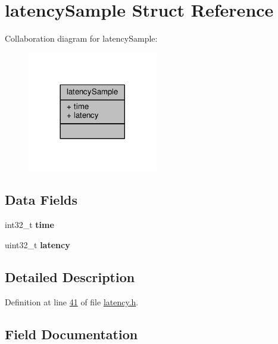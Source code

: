 \hypertarget{structlatencySample}{}\section{latency\+Sample Struct Reference}
\label{structlatencySample}


Collaboration diagram for latency\+Sample\+:\nopagebreak
\begin{figure}[H]
\begin{center}
\leavevmode
\includegraphics[width=161pt]{structlatencySample__coll__graph}
\end{center}
\end{figure}
\subsection*{Data Fields}
\begin{DoxyCompactItemize}
\item 
\mbox{\label{structlatencySample_a163b691b85c7eeafc5f495dbaf9cb52f}} 
int32\+\_\+t {\bfseries time}
\item 
\mbox{\label{structlatencySample_afedef06f839e6d4c179bdb611a72ef64}} 
uint32\+\_\+t {\bfseries latency}
\end{DoxyCompactItemize}


\subsection{Detailed Description}


Definition at line \hyperlink{latency_8h_source_l00041}{41} of file \hyperlink{latency_8h_source}{latency.\+h}.



\subsection{Field Documentation}
\mbox{\label{structlatencySample_afedef06f839e6d4c179bdb611a72ef64}} 
